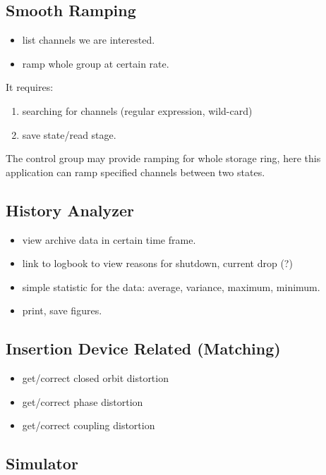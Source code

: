 \documentclass[letterpaper,showtrims]{memoir}
\begin{document}
\subsection{Smooth Ramping}

\begin{itemize}%
\item list channels we are interested.
\item ramp whole group at certain rate.
\end{itemize}
It requires:
\begin{enumerate}
\item searching for channels (regular expression, wild-card)
\item save state/read stage.
\end{enumerate}
The control group may provide ramping for whole storage ring, here this
application can ramp specified channels between two states.

\subsection{History Analyzer}

\begin{itemize}%
\item view archive data in certain time frame.
\item link to logbook to view reasons for shutdown, current drop (?)
\item simple statistic for the data: average, variance, maximum, minimum.
\item print, save figures.
\end{itemize}


\subsection{Insertion Device Related (Matching)}

\begin{itemize}%
\item get/correct closed orbit distortion
\item get/correct phase distortion
\item get/correct coupling distortion
\end{itemize}

\subsection{Simulator}
\end{document}
